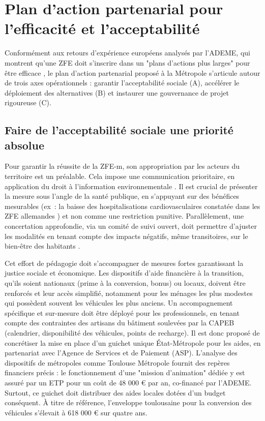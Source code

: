 \documentclass[12pt,a4paper]{article}
\begin{document}
\section{Plan d'action partenarial pour l'efficacité et l'acceptabilité}

Conformément aux retours d'expérience européens analysés par l'ADEME, qui montrent qu'une ZFE doit s'inscrire dans un "plans d'actions plus larges" pour être efficace \parencite{pouponneau2016zones}, le plan d'action partenarial proposé à la Métropole s'articule autour de trois axes opérationnels : garantir l'acceptabilité sociale (A), accélérer le déploiement des alternatives (B) et instaurer une gouvernance de projet rigoureuse (C).


\subsection{Faire de l'acceptabilité sociale une priorité absolue}

Pour garantir la réussite de la ZFE-m, son appropriation par les acteurs du territoire est un préalable. Cela impose une communication prioritaire, en application du droit à l'information environnementale \parencite{boutaric2014}. Il est crucial de présenter la mesure sous l'angle de la santé publique, en s'appuyant sur des bénéfices mesurables (ex : la baisse des hospitalisations cardiovasculaires constatée dans les ZFE allemandes \parencite{margaryanLowEmissionZones2021}) et non comme une restriction punitive. Parallèlement, une concertation approfondie, via un comité de suivi ouvert, doit permettre d'ajuster les modalités en tenant compte des impacts négatifs, même transitoires, sur le bien-être des habitants \parencite{sarmientoAirQualityWellbeing2023}.

Cet effort de pédagogie doit s'accompagner de mesures fortes garantissant la justice sociale et économique. Les dispositifs d'aide financière à la transition, qu'ils soient nationaux (prime à la conversion, bonus) ou locaux, doivent être renforcés et leur accès simplifié, notamment pour les ménages les plus modestes qui possèdent souvent les véhicules les plus anciens. Un accompagnement spécifique et sur-mesure doit être déployé pour les professionnels, en tenant compte des contraintes des artisans du bâtiment soulevées par la CAPEB (calendrier, disponibilité des véhicules, points de recharge). Il est donc proposé de concrétiser la mise en place d'un guichet unique État-Métropole pour les aides, en partenariat avec l'Agence de Services et de Paiement (ASP). L'analyse des dispositifs de métropoles comme Toulouse Métropole fournit des repères financiers précis : le fonctionnement d'une "mission d'animation" dédiée y est assuré par un ETP pour un coût de 48 000 € par an, co-financé par l'ADEME. Surtout, ce guichet doit distribuer des aides locales dotées d'un budget conséquent. À titre de référence, l'enveloppe toulousaine pour la conversion des véhicules s'élevait à 618 000 € sur quatre ans.
\end{document}
